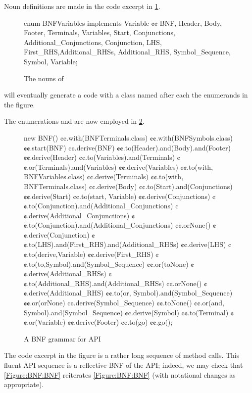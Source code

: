 Noun definitions are made in the code excerpt in \cref{Figure:Nouns}.

\begin{figure}[H]
  \begin{JAVA}[style=code]
enum BNFVariables implements Variable {¢¢
  BNF, Header, Body, Footer,
  Terminals, Variables, Start,
  Conjunctions, Additional_Conjunctions,
  Conjunction, LHS, First_RHS,Additional_RHSs,
  Additional_RHS, Symbol_Sequence,
  Symbol, Variable;
}\end{JAVA}
  \caption{The nouns of \Self}
  \label{Figure:Nouns}
\end{figure}
  \Self will eventually generate a code with
  a class named after each the enumerands in the figure.

The
enumerations  and
  are now employed in \cref{Figure:BNF:fluent}.

\begin{figure}[H]
  \begin{JAVA}[style=numbered]
new BNF()
  ¢¢.with(BNFTerminals.class)
  ¢¢.with(BNFSymbols.class)
  ¢¢.start(BNF)
  ¢¢.derive(BNF)
    ¢¢.to(Header).and(Body).and(Footer)
  ¢¢.derive(Header)
    ¢¢.to(Variables).and(Terminals)
    ¢¢.or(Terminals).and(Variables)
  ¢¢.derive(Variables)
    ¢¢.to(with, BNFVariables.class)
  ¢¢.derive(Terminals)
    ¢¢.to(with, BNFTerminals.class)
  ¢¢.derive(Body)
    ¢¢.to(Start).and(Conjunctions)
  ¢¢.derive(Start)
    ¢¢.to(start, Variable)
  ¢¢.derive(Conjunctions)
    ¢¢.to(Conjunction).and(Additional_Conjunctions)
  ¢¢.derive(Additional_Conjunctions)
    ¢¢.to(Conjunction).and(Additional_Conjunctions)
    ¢¢.orNone()
  ¢¢.derive(Conjunction)
    ¢¢.to(LHS).and(First_RHS).and(Additional_RHSs)
  ¢¢.derive(LHS)
    ¢¢.to(derive,Variable)
  ¢¢.derive(First_RHS)
    ¢¢.to(to,Symbol).and(Symbol_Sequence)
    ¢¢.or(toNone)
  ¢¢.derive(Additional_RHSs)
    ¢¢.to(Additional_RHS).and(Additional_RHSs)
    ¢¢.orNone()
  ¢¢.derive(Additional_RHS)
    ¢¢.to(or, Symbol).and(Symbol_Sequence)
    ¢¢.or(orNone)
  ¢¢.derive(Symbol_Sequence)
    ¢¢.toNone()
    ¢¢.or(and, Symbol).and(Symbol_Sequence)
  ¢¢.derive(Symbol)
    ¢¢.to(Terminal)
    ¢¢.or(Variable)
  ¢¢.derive(Footer)
    ¢¢.to(go)
¢¢.go();
\end{JAVA}
  \caption{A BNF grammar for \Self API}
  \label{Figure:BNF:fluent}
\end{figure}

The code excerpt in the figure is a rather long
  sequence of method calls.
This fluent API sequence is a reflective BNF 
  of the \Self API;
  indeed, we may check that \cref{Figure:BNF:BNF} reiterates \cref{Figure:BNF:BNF}
  (with notational changes as appropriate). 

